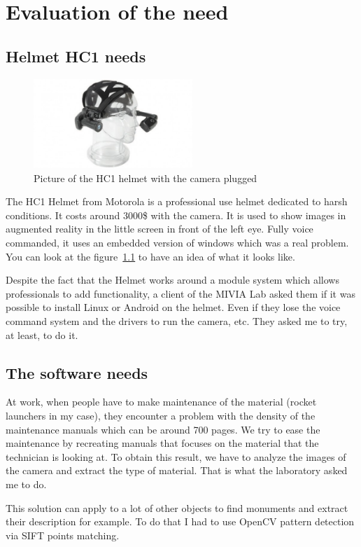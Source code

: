 \chapter{Evaluation of the need}

\section{Helmet HC1 needs}
\begin{figure}
 \begin{center}
	 \includegraphics[width=6cm]{images_not_compressed/motorola_hc1.jpg}
		\caption{Picture of the HC1 helmet with the camera plugged}
		\label{hc1}
	 \end{center}
 \end{figure}

 \par The HC1 Helmet from Motorola is a professional use helmet dedicated to harsh conditions. It costs around 3000\$ with the camera. It is used to show images in augmented reality in the little screen in front of the left eye. Fully voice commanded, it uses an embedded version of windows which was a real problem. You can look at the figure~\ref{hc1} to have an idea of what it looks like.
 
 \par Despite the fact that the Helmet works around a module system which allows professionals to add functionality, a client of the MIVIA Lab asked them if it was possible to install Linux or Android on the helmet. Even if they lose the voice command system and the drivers to run the camera, etc. They asked me to try, at least, to do it.

\section{The software needs}
 \par At work, when people have to make maintenance of the material (rocket launchers in my case), they encounter a problem with the density of the maintenance manuals which can be around 700 pages. We try to ease the maintenance by recreating manuals that focuses on the material that the technician is looking at. To obtain this result, we have to analyze the images of the camera and extract the type of material. That is what the laboratory asked me to do.
 \par This solution can apply to a lot of other objects to find monuments and extract their description for example. To do that I had to use OpenCV pattern detection via SIFT points matching.  
	